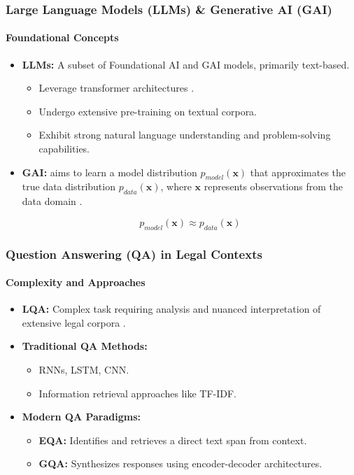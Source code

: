 \documentclass{beamer}
\begin{document}
\begin{frame}
    \frametitle{Large Language Models (\ac{LLMs}) \& Generative AI (\ac{GAI})}
    \framesubtitle{Foundational Concepts}
    \begin{itemize}
        \item \textbf{\ac{LLMs}:} A subset of Foundational \ac{AI} and \ac{GAI} models, primarily text-based.
        \begin{itemize}
            \item Leverage transformer architectures \cite{Minaee2025,Grattafiori2024}.
            \item Undergo extensive pre-training on textual corpora.
            \item Exhibit strong natural language understanding and problem-solving capabilities.
        \end{itemize}
      \item \textbf{\ac{GAI}:} aims to learn a model distribution
        $p_{model}(\mathbf{x})$ that approximates the true data
        distribution $p_{data}(\mathbf{x})$, where $\mathbf{x}$
        represents observations from the data domain \cite{Grattafiori2024}. 

\begin{equation}
  \label{eq:gai-def}
  p_{model}(\mathbf{x}) \approx p_{data}(\mathbf{x})
\end{equation}
    \end{itemize}
\end{frame}

\begin{frame}
    \frametitle{Question Answering (\ac{QA}) in Legal Contexts}
    \framesubtitle{Complexity and Approaches}
    \begin{itemize}
        \item \textbf{\ac{LQA}:} Complex task requiring analysis and nuanced interpretation of extensive legal corpora \cite{Ariai2024}.
        \item \textbf{Traditional \ac{QA} Methods:}
        \begin{itemize}
            \item \ac{RNNs}, \ac{LSTM}, \ac{CNN}.
            \item Information retrieval approaches like \ac{TF-IDF}.
        \end{itemize}
        \item \textbf{Modern \ac{QA} Paradigms:}
            \begin{itemize}
                \item \textbf{\ac{EQA}:} Identifies and retrieves a direct text span from context.
                \item \textbf{\ac{GQA}:} Synthesizes responses using encoder-decoder architectures.
            \end{itemize}
    \end{itemize}
\end{frame}
\end{document}
